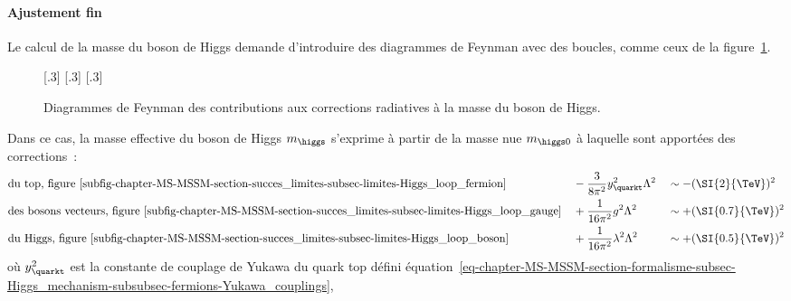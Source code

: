 \paragraph{Ajustement fin}
Le calcul de la masse du boson de Higgs demande d'introduire des diagrammes de Feynman avec des boucles, comme ceux de la figure~\ref{fig-chapter-MS-MSSM-section-succes_limites-subsec-limites-Higgs_loops}.
\begin{figure}[h]
\centering
{}[.3\textwidth]
{}
\hfill
{}[.3\textwidth]
{}
\hfill
{}[.3\textwidth]
{}

\caption{Diagrammes de Feynman des contributions aux corrections radiatives à la masse du boson de Higgs.}
\label{fig-chapter-MS-MSSM-section-succes_limites-subsec-limites-Higgs_loops}
\end{figure}
\par Dans ce cas, la masse effective du boson de Higgs $m_{\higgs}$ s'exprime à partir de la masse \og nue \fg{} $m_{\higgs 0}$ à laquelle sont apportées des corrections~\cite{Nagashima_BSM}:
\begin{align}
\allowdisplaybreaks
& \text{du top, figure~\ref{subfig-chapter-MS-MSSM-section-succes_limites-subsec-limites-Higgs_loop_fermion}} && -\frac{3}{8\pi^2} y_{\quarkt}^2 \Lambda^2 && \sim -(\SI{2}{\TeV})^2 \\
& \text{des bosons vecteurs, figure~\ref{subfig-chapter-MS-MSSM-section-succes_limites-subsec-limites-Higgs_loop_gauge}} && +\frac{1}{16\pi^2} g^2 \Lambda^2 && \sim +(\SI{0.7}{\TeV})^2 \\
& \text{du Higgs, figure~\ref{subfig-chapter-MS-MSSM-section-succes_limites-subsec-limites-Higgs_loop_boson}} && +\frac{1}{16\pi^2} \lambda^2 \Lambda^2 && \sim +(\SI{0.5}{\TeV})^2 \\
\end{align}
où
$y_{\quarkt}^2$ est la constante de couplage de Yukawa du quark top défini équation~\eqref{eq-chapter-MS-MSSM-section-formalisme-subsec-Higgs_mechanism-subsubsec-fermions-Yukawa_couplings},
